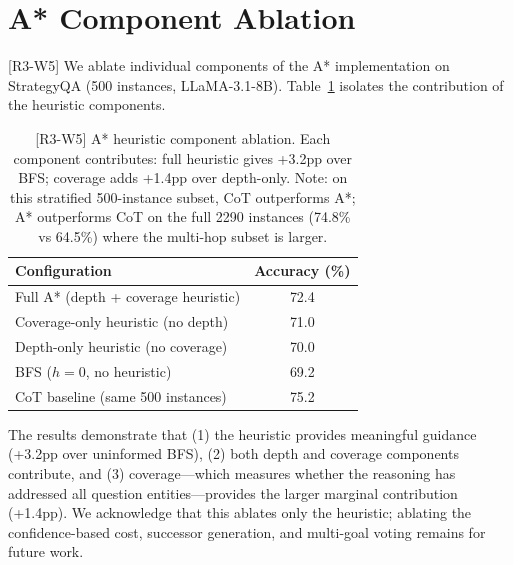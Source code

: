 \documentclass[11pt]{article}
\begin{document}
{\color{reviewerpurple}
\section{A* Component Ablation}
\label{app:component_ablation}

[R3-W5] We ablate individual components of the A* implementation on StrategyQA (500 instances, LLaMA-3.1-8B). Table~\ref{tab:component_ablation_app} isolates the contribution of the heuristic components.

\begin{table}[h]
\centering
\small
\begin{tabular}{lc}
\toprule
\textbf{Configuration} & \textbf{Accuracy (\%)} \\
\midrule
Full A* (depth + coverage heuristic) & 72.4 \\
Coverage-only heuristic (no depth) & 71.0 \\
Depth-only heuristic (no coverage) & 70.0 \\
BFS ($h=0$, no heuristic) & 69.2 \\
\midrule
CoT baseline (same 500 instances) & 75.2 \\
\bottomrule
\end{tabular}
\caption{[R3-W5] A* heuristic component ablation. Each component contributes: full heuristic gives +3.2pp over BFS; coverage adds +1.4pp over depth-only. Note: on this stratified 500-instance subset, CoT outperforms A*; A* outperforms CoT on the full 2290 instances (74.8\% vs 64.5\%) where the multi-hop subset is larger.}
\label{tab:component_ablation_app}
\end{table}

The results demonstrate that (1) the heuristic provides meaningful guidance (+3.2pp over uninformed BFS), (2) both depth and coverage components contribute, and (3) coverage---which measures whether the reasoning has addressed all question entities---provides the larger marginal contribution (+1.4pp). We acknowledge that this ablates only the heuristic; ablating the confidence-based cost, successor generation, and multi-goal voting remains for future work.
}
\end{document}
